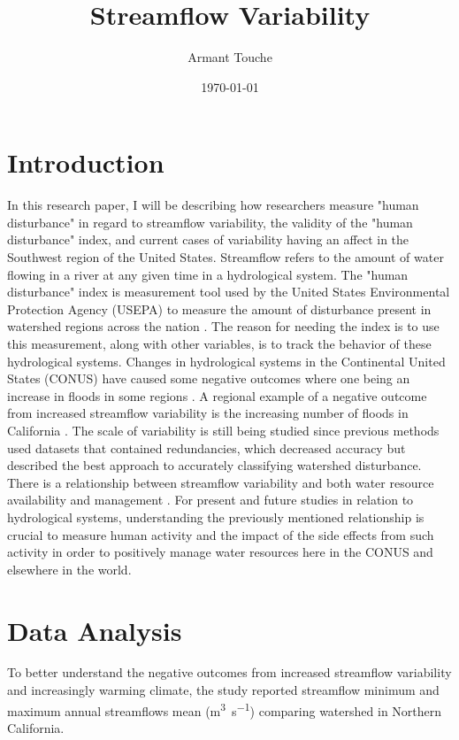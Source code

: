 \documentclass[a4paper,man,biblatex]{apa7}
\title{Streamflow Variability}
\author{Armant Touche}
\affiliation{Portland State University}
\date{\today}
\begin{document}
\section{Introduction} In this research paper, I will be describing how researchers measure "human disturbance" in regard to streamflow variability, the validity of the "human disturbance" index, and current cases of variability having an affect in the Southwest region of the United States. Streamflow refers to the amount of water flowing in a river at any given time \autocite{streamflow_def} in a hydrological system. The "human disturbance" index is measurement tool used by the United States Environmental Protection Agency (USEPA) to measure the amount of disturbance present in watershed regions across the nation \autocite{falcone_2016}. The reason for needing the index is to use this measurement, along with other variables, is to track the behavior of these hydrological systems. Changes in hydrological systems in the Continental United States (CONUS) have caused some negative outcomes where one being an increase in floods in some regions \autocite{rice_2016}. A regional example of a negative outcome from increased streamflow variability is the increasing number of floods in California \autocite{standford_2020}. The scale of variability is still being studied since previous methods used datasets that contained redundancies, which decreased accuracy but \textcite{falcone_2016} described the best approach to accurately classifying watershed disturbance. There is a relationship between streamflow variability and both water resource availability and management \autocite{rice_2016}. For present and future studies in relation to hydrological systems, understanding the previously mentioned relationship is crucial to measure human activity and the impact of the side effects from such activity in order to positively manage water resources here in the CONUS and elsewhere in the world.
\section{Data Analysis} To better understand the negative outcomes from increased streamflow variability and increasingly warming climate, the \textcite{mallakpour_2018} study reported streamflow minimum and maximum annual streamflows mean (\si{\cubic\meter\per\second}) comparing watershed in Northern California. 
\end{document}
